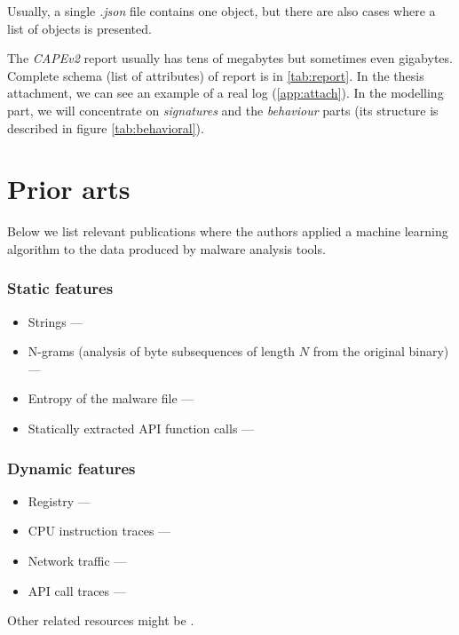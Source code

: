 Usually, a single \emph{.json} file contains one object, but there are also cases where a list of objects is presented.

The \emph{CAPEv2} report usually has tens of megabytes but sometimes even gigabytes. Complete schema (list of attributes) of report is in \ref{tab:report}. In the thesis attachment, we can see an example of a real log (\ref{app:attach}). In the modelling part, we will concentrate on \emph{signatures} and the \emph{behaviour} parts (its structure is described in figure \ref{tab:behavioral}).


\section{Prior arts}
Below we list relevant publications where the authors applied a machine learning algorithm to the data produced by malware analysis tools.
\subsubsection*{Static features}
\begin{itemize}
  \itemsep0em 
  \item Strings ---  \cite{Lee2011}
  \item N-grams (analysis of byte subsequences of length $N$ from the original binary) ---  \cite{Fuyong2017}
  \item Entropy of the malware file ---  \cite{Wojnowicz2018}
  \item Statically extracted API function calls ---  \cite{Ahmadi2016}
\end{itemize}

\subsubsection*{Dynamic features}
\begin{itemize}
  \itemsep0em 
  \item Registry ---  \cite{Ghiasi2015}
  \item CPU instruction traces ---  \cite{Carlin2017}
  \item Network traffic ---  \cite{Boukhtouta2015}
  \item API call traces ---   \cite{Galal2015}
\end{itemize}

Other related resources might be \cite{Singh2020, Sethi2019, Abdessadki2019, Gibert2020}.



